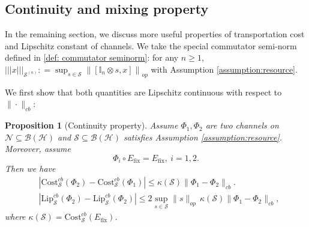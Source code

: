 \documentclass[11pt,reqno]{amsart}
\numberwithin{equation}{section}
\newtheorem{prop}[lemma]{Proposition}
\newcommand{\mb}{\mathbb}
\newcommand{\mc}{\mathcal}
\newcommand{\Lip}{\mathrm{Lip}}
\newcommand{\Cost}{\mathrm{Cost}}
\newcommand{\fix}{\mathrm{fix}}
\newcommand{\CScb}{\Cost_{\mc S}^{cb}}
\begin{document}
\subsection{Continuity and mixing property}
In the remaining section, we discuss more useful properties of transportation cost and Lipschitz constant of channels. We take the special commutator semi-norm defined in \eqref{def: commutator seminorm}: for any $n\ge 1$, $|||x|||_{\mc S^{(n)}} : = \sup_{s \in \mc S} \left\|[\mb I_n\otimes s,x]\right\|_{op}$ with Assumption \ref{assumption:resource}.

We first show that both quantities are Lipschitz continuous with respect to $\|\cdot\|_{cb}$: 
\begin{prop}[Continuity property] \label{estimate:Lipschitz continuity}
Assume $\Phi_1,\Phi_2$ are two channels on $\mc N \subseteq \mc B(\mc H)$ and $\mc S \subseteq \mc B(\mc H)$ satisfies Assumption \ref{assumption:resource}. Moreover, assume
\begin{equation}
\Phi_i \circ E_{\fix} = E_{\fix},\ i =1,2.
\end{equation}
Then we have 
\begin{align}
    & |\Cost^{cb}_{\mc S}(\Phi_2) - \Cost^{cb}_{\mc S}(\Phi_1)| \le \kappa(\mc S) \|\Phi_1-\Phi_2\|_{cb}. \label{continuity:cost} \\
    & |\Lip_{\mc S}^{cb}(\Phi_2) - \Lip_{\mc S}^{cb}(\Phi_2)| \le 2 \sup_{s\in \mc S}\|s\|_{op}\,\kappa(\mc S) \|\Phi_1-\Phi_2\|_{cb}, \label{continuity:Lip constant}
\end{align}
where $\kappa(\mc S) = \CScb(E_\fix)$. 
\end{prop}
\end{document}
